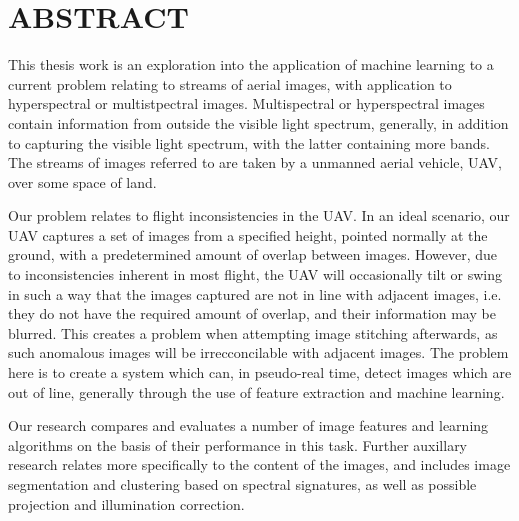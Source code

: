 %
%
%

\chapter*{ABSTRACT}

\pagestyle{plain} %
\setcounter{page}{2}

\indent This thesis work is an exploration into the application of machine learning to a current problem relating to streams of aerial images, with application to hyperspectral or multistpectral images.
Multispectral or hyperspectral images contain information from outside the visible light spectrum, generally, in addition to capturing the visible light spectrum, with the latter containing more bands.
The streams of images referred to are taken by a unmanned aerial vehicle, UAV, over some space of land.

Our problem relates to flight inconsistencies in the UAV.
In an ideal scenario, our UAV captures a set of images from a specified height, pointed normally at the ground, with a predetermined amount of overlap between images.
However, due to inconsistencies inherent in most flight, the UAV will occasionally tilt or swing in such a way that the images captured are not in line with adjacent images, i.e. they do not have the required amount of overlap, and their information may be blurred.
This creates a problem when attempting image stitching afterwards, as such anomalous images will be irrecconcilable with adjacent images.
The problem here is to create a system which can, in pseudo-real time, detect images which are out of line, generally through the use of feature extraction and machine learning.

Our research compares and evaluates a number of image features and learning algorithms on the basis of their performance in this task.
Further auxillary research relates more specifically to the content of the images, and includes image segmentation and clustering based on spectral signatures, as well as possible projection and illumination correction.


 

\pagebreak{}
